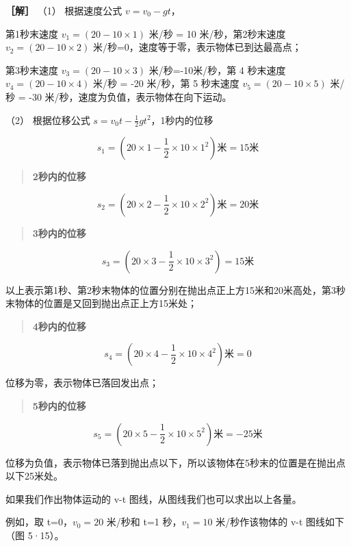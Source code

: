 \textbf{［解］} （1） 根据速度公式 \(v = v_0 - gt\)，

第1秒末速度 \(v_{1} = (20 - 10 \times 1)\) 米/秒 = 10 米/秒，第2秒末速度
\(v_{2}=(20-10\times2)\) 米/秒=0，速度等于零，表示物体已到达最高点；

第3秒末速度 \(v_{3}=(20-10\times3)\) 米/秒=-10米/秒，第 4 秒末速度
\(v_{4}=(20-10\times4)\) 米/秒 = -20 米/秒，第 5 秒末速度
\(v_{5}=(20-10\times5)\) 米/秒 = -30
米/秒，速度为负值，表示物体在向下运动。

（2） 根据位移公式 \(s = v_{0} t - \frac{1}{2} g t^{2}\)，1秒内的位移

\[
s _ {1} = \left(20 \times 1 - \frac {1}{2} \times 10 \times 1 ^ {2}\right) \text{米} = 15 \text{米}
\]

\begin{quote}
\textbf{2秒内的位移}
\end{quote}

\[
s _ {2} = \left(20 \times 2 - \frac {1}{2} \times 10 \times 2 ^ {2}\right) \text{米} = 20 \text{米}
\]

\begin{quote}
\textbf{3秒内的位移}
\end{quote}

\[
s _ {3} = \left(20 \times 3 - \frac {1}{2} \times 10 \times 3 ^ {2}\right) = 15 \text{米}
\]

以上表示第1秒、第2秒末物体的位置分别在抛出点正上方15米和20米高处，第3秒末物体的位置是又回到抛出点正上方15米处；

\begin{quote}
\textbf{4秒内的位移}
\end{quote}

\[
s _ {4} = \left(20 \times 4 - \frac {1}{2} \times 10 \times 4 ^ {2}\right) \text{米} = 0
\]

位移为零，表示物体已落回发出点；

\begin{quote}
\textbf{5秒内的位移}
\end{quote}

\[
s _ {5} = \left(20 \times 5 - \frac {1}{2} \times 10 \times 5 ^ {2}\right) \text{米} = - 25 \text{米}
\]

位移为负值，表示物体已落到抛出点以下，所以该物体在5秒末的位置是在抛出点以下25米处。

如果我们作出物体运动的 v-t 图线，从图线我们也可以求出以上各量。

例如，取 t=0，\(v_{0}=20\) 米/秒和 t=1 秒，\(v_{1}=10\) 米/秒作该物体的
v-t 图线如下（图 5·15）。

